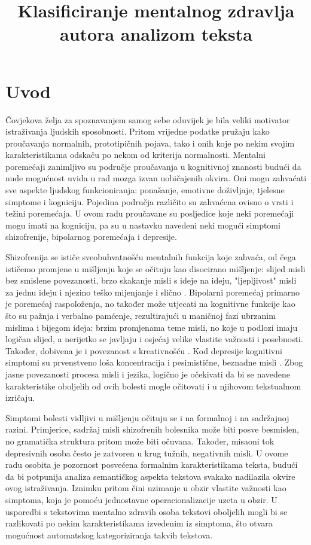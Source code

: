 \documentclass[10pt, a4paper]{article}
\title{Klasificiranje mentalnog zdravlja autora analizom teksta }
\begin{document}
\maketitleabstract

\section{Uvod}

Čovjekova želja za spoznavanjem samog sebe oduvijek je bila veliki motivator istraživanja ljudskih sposobnosti. Pritom vrijedne podatke pružaju kako proučavanja normalnih, prototipičnih pojava, tako i onih koje po nekim svojim karakteristikama odskaču po nekom od kriterija normalnosti. Mentalni poremećaji zanimljivo su područje proučavanja u kognitivnoj znanosti budući da nude mogućnost uvida u rad mozga izvan uobičajenih okvira. Oni mogu zahvaćati sve aspekte ljudskog funkcioniranja: ponašanje, emotivne doživljaje, tjelesne simptome i kogniciju. Pojedina područja različito su zahvaćena ovisno o vrsti i težini poremećaja. U ovom radu proučavane su posljedice koje neki poremećaji mogu imati na kogniciju, pa su u nastavku navedeni neki mogući simptomi shizofrenije, bipolarnog poremećaja i depresije.

Shizofrenija se ističe sveobuhvatnošću mentalnih funkcija koje zahvaća, od čega ističemo promjene u mišljenju koje se očituju kao disocirano mišljenje: slijed misli bez smislene povezanosti, brzo skakanje misli s ideje na ideju, "ljepljivost" misli za jednu ideju i njezino teško mijenjanje i slično \citep{icd}. Bipolarni poremećaj primarno je poremećaj raspoloženja, no također može utjecati na kognitivne funkcije kao što su pažnja i verbalno pamćenje, rezultirajući u maničnoj fazi ubrzanim mislima i bijegom ideja: brzim promjenama teme misli, no koje u podlozi imaju logičan slijed, a nerijetko se javljaju i osjećaj velike vlastite važnosti i posebnosti. Također, dobivena je i povezanost s kreativnošću \citep{crea}. Kod depresije kognitivni simptomi su prvenstveno loša koncentracija i pesimistične, beznadne misli \citep{dsm}. Zbog jasne povezanosti procesa misli i jezika, logično je očekivati da bi se navedene karakteristike oboljelih od ovih bolesti mogle očitovati i u njihovom tekstualnom izričaju. 

Simptomi bolesti vidljivi u mišljenju očituju se i na formalnoj i na sadržajnoj razini. Primjerice, sadržaj misli shizofrenih bolesnika može biti posve besmislen, no gramatička struktura pritom može biti očuvana. Također, misaoni tok depresivnih osoba često je zatvoren u krug tužnih, negativnih misli. U ovome radu osobita je pozornost posvećena formalnim karakteristikama teksta, budući da bi potpunija analiza semantičkog aspekta tekstova svakako nadilazila okvire ovog istraživanja. Iznimku pritom čini uzimanje u obzir vlastite važnosti kao simptoma, koja je pomoću jednostavne operacionalizacije uzeta u obzir. U usporedbi s tekstovima mentalno zdravih osoba tekstovi oboljelih mogli bi se razlikovati po nekim karakteristikama izvedenim iz simptoma, što otvara mogućnost automatskog kategoriziranja takvih tekstova. 
\end{document}

